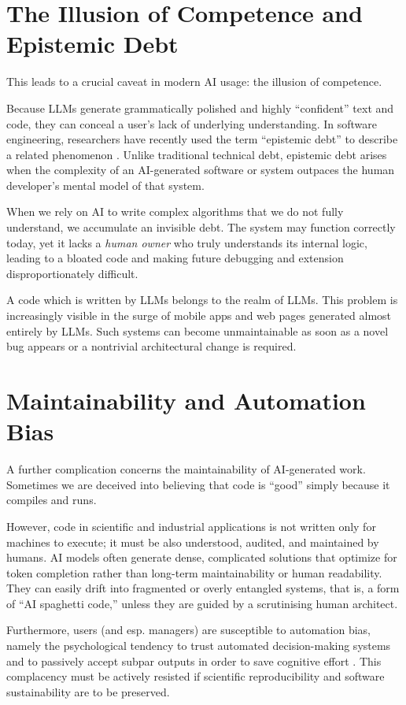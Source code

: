 \documentclass[10pt,a4paper]{article}
\begin{document}
\section{The Illusion of Competence and Epistemic Debt}
This leads to a crucial caveat in modern AI usage: the illusion of competence.

Because LLMs generate grammatically polished and highly ``confident'' text and code, they can conceal a user's lack of underlying understanding. In software engineering, researchers have recently used the term ``epistemic debt'' to describe a related phenomenon \cite{ngabang2026,boeckeler2026}. Unlike traditional technical debt, epistemic debt arises when the complexity of an AI-generated software or system outpaces the human developer's mental model of that system.

When we rely on AI to write complex algorithms that we do not fully understand, we accumulate an invisible debt. The system may function correctly today, yet it lacks a \emph{human owner} who truly understands its internal logic, leading to a bloated code and making future debugging and extension disproportionately difficult.

A code which is written by LLMs belongs to the realm of LLMs.
This problem is increasingly visible in the surge of mobile apps and web pages generated almost entirely by LLMs. Such systems can become unmaintainable as soon as a novel bug appears or a nontrivial architectural change is required.

\section{Maintainability and Automation Bias}
A further complication concerns the maintainability of AI-generated work. Sometimes we are deceived into believing that code is ``good'' simply because it compiles and runs.

However, code in scientific and industrial applications is not written only for machines to execute; it must be also understood, audited, and maintained by humans. AI models often generate dense, complicated solutions that optimize for token completion rather than long-term maintainability or human readability. They can easily drift into fragmented or overly entangled systems, that is, a form of ``AI spaghetti code,'' unless they are guided by a scrutinising human architect.

Furthermore, users (and esp. managers) are susceptible to automation bias, namely the psychological tendency to trust automated decision-making systems and to passively accept subpar outputs in order to save cognitive effort \cite{qazi2025}. This complacency must be actively resisted if scientific reproducibility and software sustainability are to be preserved.
\end{document}

